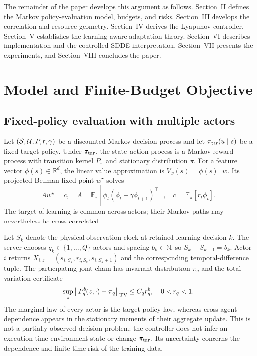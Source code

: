 \documentclass[journal]{IEEEtran}
\newcommand{\E}{\mathbb{E}}
\newcommand{\R}{\mathbb{R}}
\begin{document}
The remainder of the paper develops this argument as follows.
Section~II defines the Markov policy-evaluation model, budgets, and risks.
Section~III develops the correlation and resource geometry.
Section~IV derives the Lyapunov controller.
Section~V establishes the learning-aware adaptation theory.
Section~VI describes implementation and the controlled-SDDE interpretation.
Section~VII presents the experiments, and Section~VIII concludes the paper.

\section{Model and Finite-Budget Objective}
\subsection{Fixed-policy evaluation with multiple actors}
Let $({\cal S},{\cal U},P,r,\gamma)$ be a discounted Markov decision process and let $\pi_{\rm tar}(u\mid s)$ be a fixed target policy.
Under $\pi_{\rm tar}$, the state--action process is a Markov reward process with transition kernel $P_{\pi}$ and stationary distribution $\pi$.
For a feature vector $\phi(s)\in\R^d$, the linear value approximation is $V_w(s)=\phi(s)^\top w$.
Its projected Bellman fixed point $w^\star$ solves
\begin{equation}
A w^\star=c,
\quad
A=\E_\pi[\phi_t(\phi_t-\gamma\phi_{t+1})^\top],
\quad
c=\E_\pi[r_t\phi_t].
\label{eq:projected-fixed-point}
\end{equation}
The target of learning is common across actors; their Markov paths may nevertheless be cross-correlated.

Let $S_k$ denote the physical observation clock at retained learning decision $k$.
The server chooses $q_k\in\{1,\ldots,Q\}$ actors and spacing $b_k\in\mathbb{N}$, so $S_k-S_{k-1}=b_k$.
Actor $i$ returns $X_{i,k}=(s_{i,S_k},r_{i,S_k},s_{i,S_k+1})$ and the corresponding temporal-difference tuple.
The participating joint chain has invariant distribution $\pi_q$ and the total-variation certificate
\begin{equation}
\sup_z\left\|P_q^b(z,\cdot)-\pi_q\right\|_{\rm TV}\le C_qr_q^b,
\quad 0<r_q<1.
\label{eq:mixing}
\end{equation}
The marginal law of every actor is the target-policy law, whereas cross-agent dependence appears in the stationary moments of their aggregate update.
This is not a partially observed decision problem: the controller does not infer an execution-time environment state or change $\pi_{\rm tar}$.
Its uncertainty concerns the dependence and finite-time risk of the training data.
\end{document}
